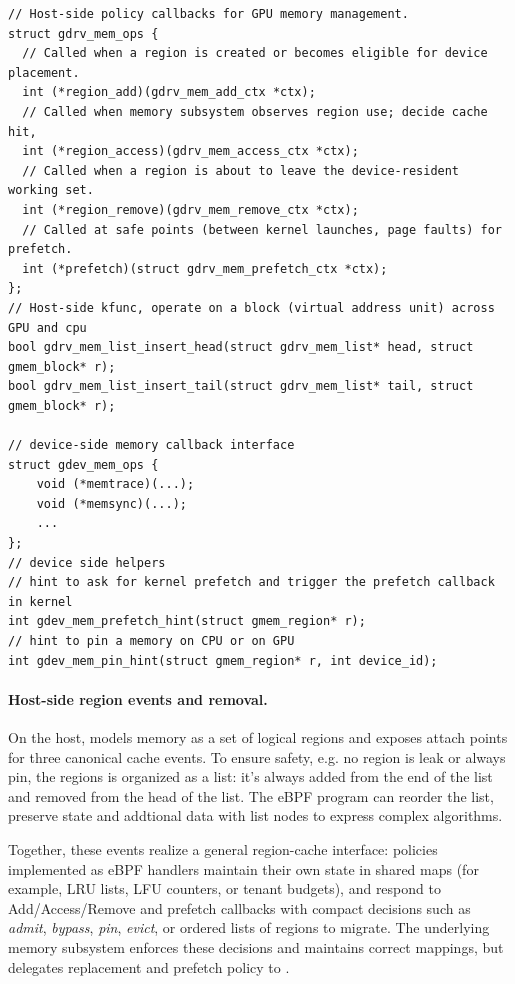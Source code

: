 \begin{verbatim}
// Host-side policy callbacks for GPU memory management.
struct gdrv_mem_ops {
  // Called when a region is created or becomes eligible for device placement.
  int (*region_add)(gdrv_mem_add_ctx *ctx);
  // Called when memory subsystem observes region use; decide cache hit,
  int (*region_access)(gdrv_mem_access_ctx *ctx);
  // Called when a region is about to leave the device-resident working set.
  int (*region_remove)(gdrv_mem_remove_ctx *ctx);
  // Called at safe points (between kernel launches, page faults) for prefetch.
  int (*prefetch)(struct gdrv_mem_prefetch_ctx *ctx);
};
// Host-side kfunc, operate on a block (virtual address unit) across GPU and cpu
bool gdrv_mem_list_insert_head(struct gdrv_mem_list* head, struct gmem_block* r);
bool gdrv_mem_list_insert_tail(struct gdrv_mem_list* tail, struct gmem_block* r);

// device-side memory callback interface
struct gdev_mem_ops {
    void (*memtrace)(...);
    void (*memsync)(...);
    ...
};
// device side helpers
// hint to ask for kernel prefetch and trigger the prefetch callback in kernel
int gdev_mem_prefetch_hint(struct gmem_region* r);
// hint to pin a memory on CPU or on GPU
int gdev_mem_pin_hint(struct gmem_region* r, int device_id);
\end{verbatim}

\paragraph{Host-side region events and removal.}
On the host, \sys models memory as a set of logical regions and exposes attach points for three
canonical cache events. To ensure safety, e.g. no region is leak or always pin, the regions is organized as a list: it's always added from the end of the list and removed from the head of the list. The eBPF program can reorder the list, preserve state and addtional data with list nodes to express complex algorithms.

Together, these events realize a
general region-cache interface: policies implemented as eBPF handlers maintain their
own state in shared maps (for example, LRU lists, LFU counters, or tenant budgets),
and respond to Add/Access/Remove and prefetch callbacks with compact decisions
such as \emph{admit}, \emph{bypass}, \emph{pin}, \emph{evict}, or ordered lists
of regions to migrate. The underlying memory subsystem enforces these decisions
and maintains correct mappings, but delegates replacement and prefetch policy to
\sys.

